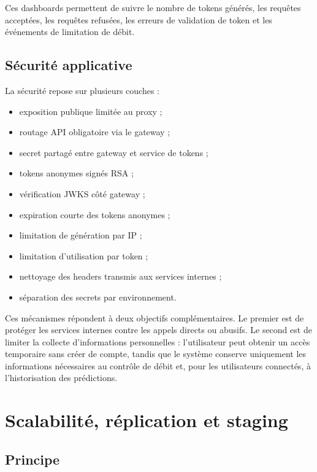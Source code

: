 ﻿\documentclass[12pt, a4paper]{report}
\begin{document}
Ces dashboards permettent de suivre le nombre de tokens générés, les requêtes
acceptées, les requêtes refusées, les erreurs de validation de token et les
événements de limitation de débit.

\section{Sécurité applicative}

La sécurité repose sur plusieurs couches :

\begin{itemize}
  \item exposition publique limitée au proxy ;
  \item routage API obligatoire via le gateway ;
  \item secret partagé entre gateway et service de tokens ;
  \item tokens anonymes signés RSA ;
  \item vérification JWKS côté gateway ;
  \item expiration courte des tokens anonymes ;
  \item limitation de génération par IP ;
  \item limitation d'utilisation par token ;
  \item nettoyage des headers transmis aux services internes ;
  \item séparation des secrets par environnement.
\end{itemize}

Ces mécanismes répondent à deux objectifs complémentaires. Le premier est de
protéger les services internes contre les appels directs ou abusifs. Le second
est de limiter la collecte d'informations personnelles : l'utilisateur peut
obtenir un accès temporaire sans créer de compte, tandis que le système conserve
uniquement les informations nécessaires au contrôle de débit et, pour les
utilisateurs connectés, à l'historisation des prédictions.


\chapter{Scalabilité, réplication et staging}

\section{Principe}
\end{document}
